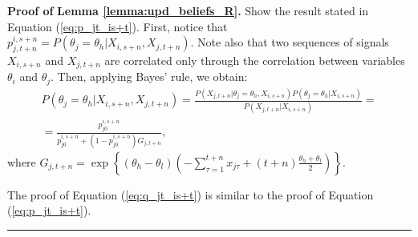\documentclass[12pt]{article}
\newenvironment{proof}[1][Proof of]{\noindent\textbf{#1} }{\ \rule{0.5em}{0.5em}}
\begin{document}
\begin{proof}
     \textbf{Lemma \ref{lemma:upd_beliefs_R}.}
Show the result stated in Equation (\ref{eq:p_jt_is+t}). First, notice that \(p_{j,t+n}^{i,s+n} = P(\theta_j = \theta_h | X_{i,s+n}, X_{j,t+n})\). Note also that two sequences of signals \(X_{i,s+n}\) and \(X_{j,t+n}\) are correlated only through the correlation between variables \(\theta_i\) and \(\theta_j\). Then, applying Bayes' rule, we obtain:
\begin{equation*}
    \begin{aligned}
        P(\theta_j = \theta_h | X_{i,s+n}, X_{j,t+n}) 
        = 
        \frac{P(X_{j,t+n}|\theta_j = \theta_h, X_{i,s+n})P(\theta_j = \theta_h | X_{i,s+n})}{P(X_{j,t+n}|X_{i,s+n})}
         = \\
         = 
         \frac{p_{j0}^{i,s+n}}{p_{j0}^{i,s+n} + (1-p_{j0}^{i,s+n})G_{j,t+n}},
    \end{aligned}
\end{equation*}
where $G_{j,t+n} = \exp \left\lbrace (\theta_h - \theta_l)(-\sum_{\tau = 1}^{t+n}x_{j\tau} + (t+n)\frac{\theta_h + \theta_l}{2}) \right \rbrace$.

The proof of Equation (\ref{eq:q_jt_is+t}) is similar to the proof of Equation (\ref{eq:p_jt_is+t}).
\end{proof}
\end{document}
